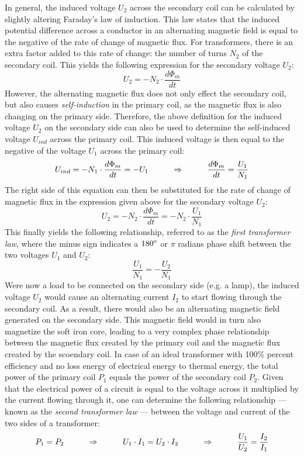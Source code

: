 In general, the induced voltage $U_2$ across the secondary coil can be calculated by slightly altering Faraday's law of induction. This law states that the induced potential difference across a conductor in an alternating magnetic field is equal to the negative of the rate of change of magnetic flux. For transformers, there is an extra factor added to this rate of change: the number of turns $N_2$ of the secondary coil. This yields the following expression for the secondary voltage $U_2$: $$U_2 = -N_2 \cdot \frac{d \Phi_m}{d t}$$ However, the alternating magnetic flux does not only effect the secondary coil, but also causes \emph{self-induction} in the primary coil, as the magnetic flux is also changing on the primary side. Therefore, the above definition for the induced voltage $U_2$ on the secondary side can also be used to determine the self-induced voltage $U_{ind}$ across the primary coil. This induced voltage is then equal to the negative of the voltage $U_1$ across the primary coil: $$U_{ind} = -N_1 \cdot \frac{d \Phi_m}{d t} = -U_1 \hspace{1 cm} \Rightarrow \hspace{1 cm} \frac{d \Phi_m}{d t} = \frac{U_1}{N_1}$$ The right side of this equation can then be substituted for the rate of change of magnetic flux in the expression given above for the secondary voltage $U_2$: $$U_2 = -N_2 \cdot \frac{d \Phi_m}{dt} = -N_2 \cdot \frac{U_1}{N_1}$$ This finally yields the following relationship, referred to as the \emph{first transformer law}, where the minus sign indicates a $180\degree$ or $\pi$ radians phase shift between the two voltages $U_1$ and $U_2$: $$\frac{U_1}{N_1} = -\frac{U_2}{N_1}$$ Were now a load to be connected on the secondary side (e.g. a lamp), the induced voltage $U_2$ would cause an alternating current $I_2$ to start flowing through the secondary coil. As a result, there would also be an alternating magnetic field generated on the secondary side. This magnetic field would in turn also magnetize the soft iron core, leading to a very complex phase relationship between the magnetic flux created by the primary coil and the magnetic flux created by the scoendary coil. In case of an ideal transformer with 100\% percent efficiency and no loss energy of electrical energy to thermal energy, the total power of the primary coil $P_1$ equals the power of the secondary coil $P_2$. Given that the electrical power of a circuit is equal to the voltage across it multiplied by the current flowing through it, one can determine the following relationship --- known as the \emph{second transformer law} --- between the voltage and current of the two sides of a transformer: $$P_1 = P_2 \hspace{1 cm} \Rightarrow \hspace{1 cm} U_1 \cdot I_1 = U_2 \cdot I_2 \hspace{1 cm} \Rightarrow \hspace{1 cm} \frac{U_1}{U_2} = \frac{I_2}{I_1}$$

